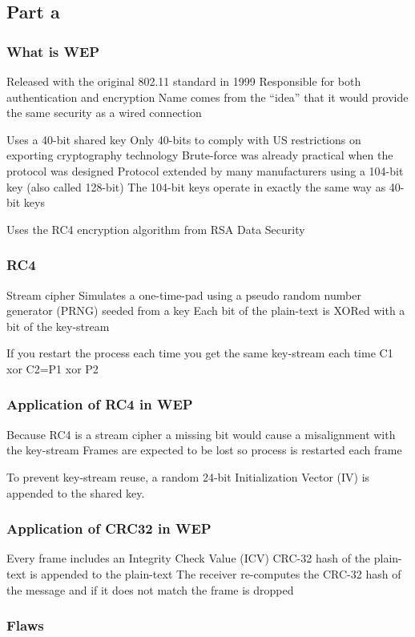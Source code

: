 \documentclass[pdftex, 12pt, a4paper]{article}
\begin{document}
\subsection{Part a}
\subsubsection{What is WEP}
Released with the original 802.11 standard in 1999
Responsible for both authentication and encryption
Name comes from the ``idea'' that it would provide the same security as a wired connection

Uses a 40-bit shared key
Only 40-bits to comply with US restrictions on exporting cryptography technology
Brute-force was already practical when the protocol was designed
Protocol extended by many manufacturers using a 104-bit key (also called 128-bit)
The 104-bit keys operate in exactly the same way as 40-bit keys

Uses the RC4 encryption algorithm from RSA Data Security

\subsubsection{RC4}
Stream cipher
Simulates a one-time-pad using a pseudo random number generator (PRNG) seeded from a key
Each bit of the plain-text is XORed with a bit of the key-stream

If you restart the process each time you get the same key-stream each time
C1 xor C2=P1 xor P2

\subsubsection{Application of RC4 in WEP}
Because RC4 is a stream cipher a missing bit would cause a misalignment with the key-stream
Frames are expected to be lost so process is restarted each frame

To prevent key-stream reuse, a random 24-bit Initialization Vector (IV) is appended to the shared key.

\subsubsection{Application of CRC32 in WEP}
Every frame includes an Integrity Check Value (ICV)
CRC-32 hash of the plain-text is appended to the plain-text
The receiver re-computes the CRC-32 hash of the message and if it does not match the frame is dropped

\subsubsection{Flaws}
\end{document}

